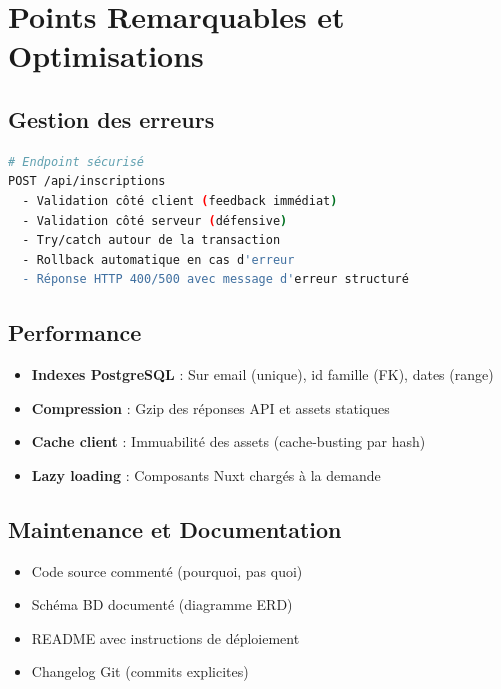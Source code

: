 \documentclass[11pt,a4paper]{article}
\begin{document}
\section{Points Remarquables et Optimisations}

\subsection{Gestion des erreurs}

\begin{lstlisting}[language=bash]
# Endpoint sécurisé
POST /api/inscriptions
  - Validation côté client (feedback immédiat)
  - Validation côté serveur (défensive)
  - Try/catch autour de la transaction
  - Rollback automatique en cas d'erreur
  - Réponse HTTP 400/500 avec message d'erreur structuré
\end{lstlisting}

\subsection{Performance}

\begin{itemize}
  \item \textbf{Indexes PostgreSQL} : Sur email (unique), id famille (FK), dates (range)
  \item \textbf{Compression} : Gzip des réponses API et assets statiques
  \item \textbf{Cache client} : Immuabilité des assets (cache-busting par hash)
  \item \textbf{Lazy loading} : Composants Nuxt chargés à la demande
\end{itemize}

\subsection{Maintenance et Documentation}

\begin{itemize}
  \item Code source commenté (pourquoi, pas quoi)
  \item Schéma BD documenté (diagramme ERD)
  \item README avec instructions de déploiement
  \item Changelog Git (commits explicites)
\end{itemize}

\end{document}
